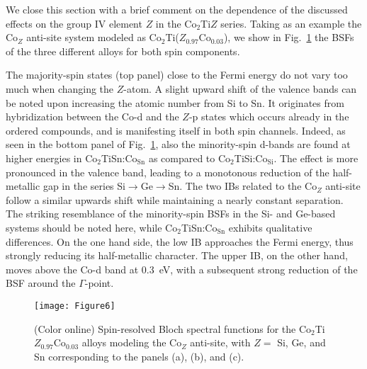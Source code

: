 \documentclass[aps,prb,twocolumn,superscriptaddress,showpacs]{revtex4}
\newcommand{\FG}[1]{Fig.~\ref{#1}}
\begin{document}
We close this section with a brief comment on the dependence of
the discussed effects on the group IV element $Z$ in the
Co$_2$Ti$Z$ series. Taking as an example the Co$_Z$ anti-site system 
modeled as Co$_2$Ti($Z_{0.97}$Co$_{0.03}$), 
we show in \FG{Co2TiZCoZBSF} the BSFs of the three different alloys
for both spin components. 

The majority-spin states (top panel) 
close to the Fermi energy do not vary too
much when changing the $Z$-atom. 
A slight upward shift of the valence bands 
can be noted upon increasing the atomic
number from Si to Sn. It originates from
hybridization between the Co-d and the
$Z$-p states which occurs already in the 
ordered compounds,\cite{SSK10,PCF02}
and is manifesting itself in both spin channels.
Indeed, as seen in the bottom panel of
\FG{Co2TiZCoZBSF}, also the minority-spin d-bands
are found at higher energies in 
Co$_2$TiSn:Co$_\text{Sn}$ 
as compared to Co$_2$TiSi:Co$_\text{Si}$.
The effect is more pronounced in the 
valence band, leading to a monotonous
reduction of the half-metallic gap 
in the series Si$\to$Ge$\to$Sn. 
The two IBs related to the Co$_Z$ anti-site 
follow a similar upwards shift while maintaining
a nearly constant separation. The striking resemblance 
of the minority-spin BSFs in the Si- and Ge-based systems
should be noted here, while Co$_2$TiSn:Co$_\text{Sn}$ exhibits 
qualitative differences. On the one hand side, 
the low IB approaches the Fermi energy, thus
strongly reducing its half-metallic character.
The upper IB, on the other hand, 
moves above the Co-d band at $0.3$~eV, 
with a subsequent strong reduction of the
BSF around the $\Gamma$-point. 

\begin{figure}
  \centering
  \texttt{[image: Figure6]}
    \caption{(Color online) Spin-resolved Bloch spectral functions 
      for the Co$_2$Ti$Z_{0.97}$Co$_{0.03}$ alloys modeling the
      Co$_Z$ anti-site, with $Z=$ Si, Ge, and Sn corresponding to the
      panels (a), (b), and (c).}
  \label{Co2TiZCoZBSF}
\end{figure}

\end{document}
